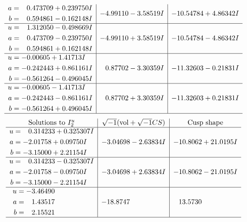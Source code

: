 \documentclass[1p]{elsarticle_modified}
\theoremstyle{definition}
\newcommand{\I}{\sqrt{-1}}
\begin{document}
$$\begin{array}{c|c|c}
\begin{aligned}
a &= \phantom{-}0.473709 + 0.239750 I \\
b &= \phantom{-}0.594861 - 0.162148 I\end{aligned}
 & -4.99110 - 3.58519 I & -10.54784 + 4.86342 I \\ \hline\begin{aligned}
u &= \phantom{-}1.312050 - 0.498669 I \\
a &= \phantom{-}0.473709 - 0.239750 I \\
b &= \phantom{-}0.594861 + 0.162148 I\end{aligned}
 & -4.99110 + 3.58519 I & -10.54784 - 4.86342 I \\ \hline\begin{aligned}
u &= -0.00605 + 1.41713 I \\
a &= -0.242443 + 0.861161 I \\
b &= -0.561264 - 0.496045 I\end{aligned}
 & \phantom{-}0.87702 - 3.30359 I & -11.32603 - 0.21831 I \\ \hline\begin{aligned}
u &= -0.00605 - 1.41713 I \\
a &= -0.242443 - 0.861161 I \\
b &= -0.561264 + 0.496045 I\end{aligned}
 & \phantom{-}0.87702 + 3.30359 I & -11.32603 + 0.21831 I\\
 \hline 
 \end{array}$$\newpage$$\begin{array}{c|c|c}  
\text{Solutions to }I^u_{2}& \I (\text{vol} + \sqrt{-1}CS) & \text{Cusp shape}\\
 \hline 
\begin{aligned}
u &= \phantom{-}0.314233 + 0.325307 I \\
a &= -2.01758 + 0.09750 I \\
b &= -3.15000 + 2.21154 I\end{aligned}
 & -3.04698 - 2.63834 I & -10.8062 + 21.0195 I \\ \hline\begin{aligned}
u &= \phantom{-}0.314233 - 0.325307 I \\
a &= -2.01758 - 0.09750 I \\
b &= -3.15000 - 2.21154 I\end{aligned}
 & -3.04698 + 2.63834 I & -10.8062 - 21.0195 I \\ \hline\begin{aligned}
u &= -3.46490\phantom{ +0.000000I} \\
a &= \phantom{-}1.43517\phantom{ +0.000000I} \\
b &= \phantom{-}2.15521\phantom{ +0.000000I}\end{aligned}
 & -18.8747\phantom{ +0.000000I} & \phantom{-}13.5730\phantom{ +0.000000I}\\
 \hline 
 \end{array}$$\newpage\newpage\renewcommand{\arraystretch}{1}
\end{document}
